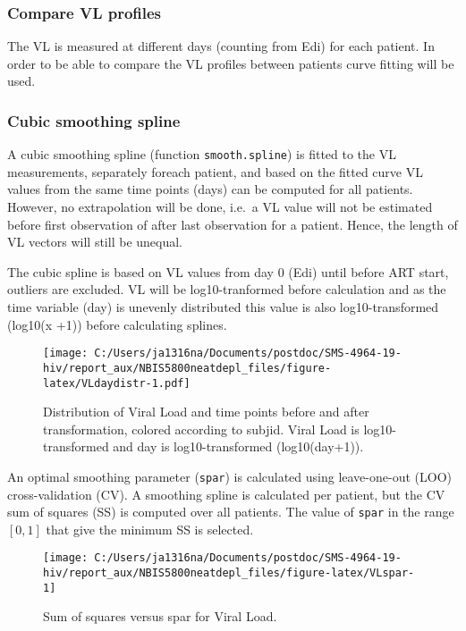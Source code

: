 \documentclass[
]{article}
\begin{document}
\FloatBarrier

\hypertarget{compare-vl-profiles}{%
\subsubsection{Compare VL profiles}\label{compare-vl-profiles}}

The VL is measured at different days (counting from Edi) for each patient. In order to be able to compare the VL profiles between patients curve fitting will be used.

\hypertarget{cubic-smoothing-spline}{%
\subsubsection{Cubic smoothing spline}\label{cubic-smoothing-spline}}

A cubic smoothing spline (function \texttt{smooth.spline}) is fitted to the VL measurements, separately foreach patient, and based on the fitted curve VL values from the same time points (days) can be computed for all patients. However, no extrapolation will be done, i.e.~a VL value will not be estimated before first observation of after last observation for a patient. Hence, the length of VL vectors will still be unequal.

The cubic spline is based on VL values from day 0 (Edi) until before ART start, outliers are excluded. VL will be log10-tranformed before calculation and as the time variable (day) is unevenly distributed this value is also log10-transformed (log10(x +1)) before calculating splines.

\begin{figure}
\centering
\texttt{[image: C:/Users/ja1316na/Documents/postdoc/SMS-4964-19-hiv/report\_aux/NBIS5800neatdepl\_files/figure-latex/VLdaydistr-1.pdf]}
\caption{\label{fig:VLdaydistr}Distribution of Viral Load and time points before and after transformation, colored according to subjid. Viral Load is log10-transformed and day is log10-transformed (log10(day+1)).}
\end{figure}

An optimal smoothing parameter (\texttt{spar}) is calculated using leave-one-out (LOO) cross-validation (CV). A smoothing spline is calculated per patient, but the CV sum of squares (SS) is computed over all patients. The value of \texttt{spar} in the range \([0,1]\) that give the minimum SS is selected.

\begin{figure}
\texttt{[image: C:/Users/ja1316na/Documents/postdoc/SMS-4964-19-hiv/report\_aux/NBIS5800neatdepl\_files/figure-latex/VLspar-1]} \caption{Sum of squares versus spar for Viral Load.}\label{fig:VLspar}
\end{figure}
\end{document}
